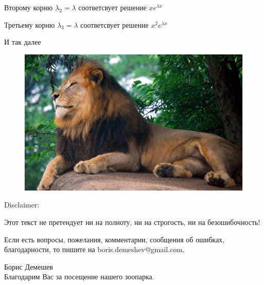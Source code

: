 \documentclass[10pt, a4paper]{article}
\begin{document}
\par Второму корню $\lambda_2 = \lambda$ соответсвует решение $xe^{\lambda x}$
\par Третьему корню $\lambda_3 = \lambda$ соответсвует решение $x^2e^{\lambda x}$
\par И так далее
\newpage
\pagecolor{YellowOrange}
\begin{figure}[h]
\centerline{\includegraphics[width = 12cm]{king.jpg}}
\end{figure}
\par Disclaimer:
\par Этот текст не претендует ни на полноту, ни на строгость, ни на безошибочность!
\par Если есть вопросы, пожелания, комментарии, сообщения об ошибках, благодарности, то пишите на boris.demeshev@gmail.com.
\par Борис Демешев \\

Благодарим Вас за посещение нашего зоопарка.
\end{document}
